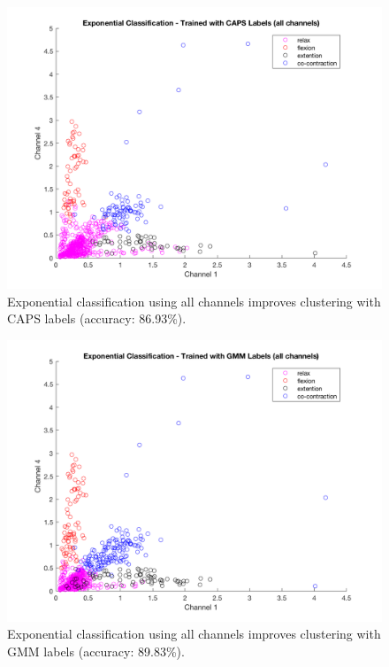 \documentclass[times, 10pt,twocolumn]{article}
\begin{document}
\begin{figure}[h]
  \includegraphics[width=\linewidth]{Figures/f11.png}
  \caption{Exponential classification using all channels improves clustering with CAPS labels (accuracy: 86.93\%).}
  \label{expCAPSall}
\end{figure}

\begin{figure}[h]
  \includegraphics[width=\linewidth]{Figures/f12.png}
  \caption{Exponential classification using all channels improves clustering with GMM labels (accuracy: 89.83\%).}
  \label{expGMMall}
\end{figure}
\end{document}
